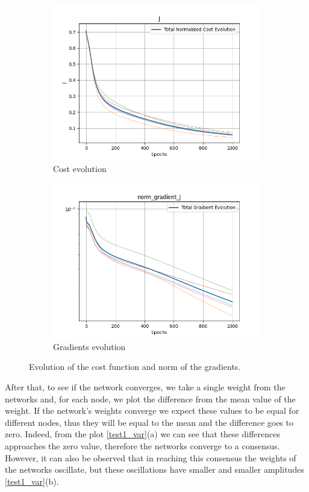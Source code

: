 \documentclass[a4paper,11pt,oneside]{book}
\begin{document}
\begin{figure}[h]
\centering
	\begin{subfigure}{0.49\textwidth}	
	\includegraphics[scale=0.43]{test1/J}
	\caption{Cost evolution}
	\end{subfigure}
\hfill
	\begin{subfigure}{0.49\textwidth}	
	\includegraphics[scale=0.43]{test1/norm_gradient_J}
	\caption{Gradients evolution}
	\end{subfigure}
\caption{Evolution of the cost function and norm of the gradients.}
\label{test1_loss}
\end{figure}

After that, to see if the network converges, we take a single weight from the networks and, for each node, we plot the difference from the mean value of the weight. If the network's weights converge we expect these values to be equal for different nodes, thus they will be equal to the mean and the difference goes to zero. Indeed, from the plot \ref{test1_var}(a) we can see that these differences approaches the zero value, therefore the networks converge to a consensus. However, it can also be observed that in reaching this consensus the weights of the networks oscillate, but these oscillations have smaller and smaller amplitudes \ref{test1_var}(b).
\end{document}
